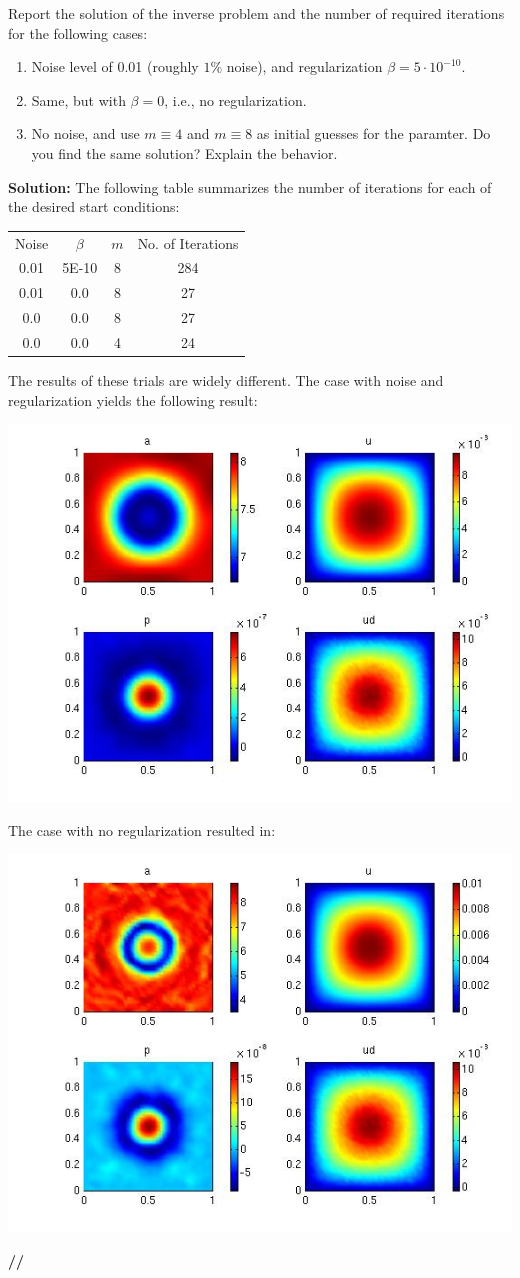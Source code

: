 \documentclass[11pt]{article}
\newenvironment{solution}{\begin{trivlist}\item[]{\bf Solution:}}
                      {\textbf{//} \end{trivlist}}
\begin{document}
\begin{enumerate}
\item[(a)] Report the solution of the inverse problem and the number of
	  required iterations for the following cases:



\begin{enumerate}
\item[$\bullet$] Noise level of 0.01 (roughly $1\%$ noise), and
	     regularization $\beta = 5 \cdot 10^{−10}$. 
 \item[$\bullet$] Same, but with $\beta = 0$, i.e., no regularization. 
 \item[$\bullet$] No noise, and use $m \equiv 4$ and $m \equiv 8$ as
	      initial guesses for the paramter. Do you find the same solution? Explain the behavior. 
\end{enumerate}
\begin{solution}
The following table summarizes the number of iterations for each of the
 desired start conditions: 
\begin{center}
\begin{tabular}{| c | c | c | c |} \cline{1-4}
Noise & $\beta$ & $m$ & No. of Iterations \\ \cline{1-4}
0.01 & 5E-10 & 8 & 284 \\ \cline{1-4}
0.01 & 0.0 & 8 & 27 \\ \cline{1-4}
0.0 & 0.0 & 8 & 27 \\ \cline{1-4}
0.0 & 0.0 & 4 & 24 \\ \cline{1-4} 
\end{tabular} 
\end{center}
The results of these trials are widely different. The case with noise
 and regularization yields the following result: 
\begin{center}
\includegraphics[width = 6 cm]{figs/prob2aNoiseRegM8.jpg}
\end{center}

The case with no regularization resulted in:
\begin{center}
\includegraphics[width = 6 cm]{figs/prob2aNoiseNoRegM8.jpg}
\end{center}


\end{solution}
\end{enumerate}
\end{document}
